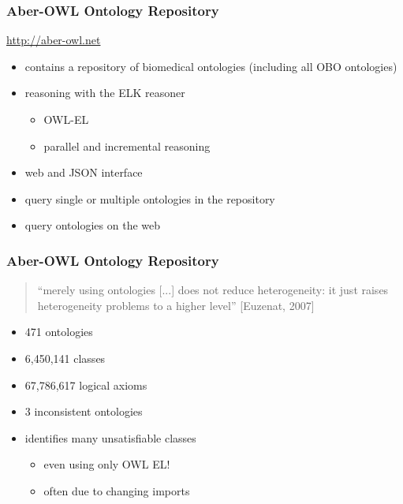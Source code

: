 \documentclass{beamer}
\begin{document}
\begin{frame}
  \frametitle{Aber-OWL Ontology Repository}
  \centerline{\url{http://aber-owl.net}}
  \vspace{1cm}
  \begin{itemize}
  \item contains a repository of biomedical ontologies (including all OBO ontologies)
  \item reasoning with the ELK reasoner
    \begin{itemize}
    \item OWL-EL
    \item parallel and incremental reasoning
    \end{itemize}
  \item web and JSON interface
  \item query single or multiple ontologies in the repository
  \item query ontologies on the web
  \end{itemize}
\end{frame}

\begin{frame}
  \frametitle{Aber-OWL Ontology Repository}
  \begin{quote}
    ``merely using ontologies [...] does not reduce heterogeneity: it
    just raises heterogeneity problems to a higher level''
  [Euzenat, 2007] \end{quote} 
  \begin{itemize}
  \item 471 ontologies
  \item 6,450,141 classes
  \item 67,786,617 logical axioms
  \item 3 inconsistent ontologies
  \item identifies many unsatisfiable classes
    \begin{itemize}
    \item even using only OWL EL!
    \item often due to changing imports
    \end{itemize}
  \end{itemize}
\end{frame}
\end{document}
